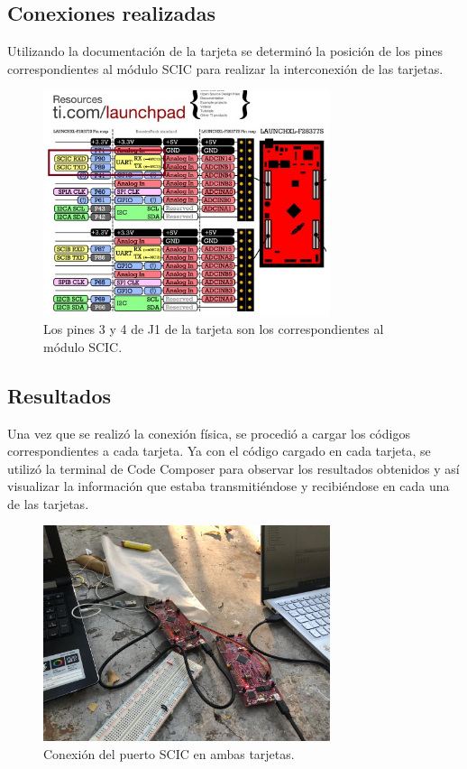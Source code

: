 \documentclass[12pt, letterpaper]{article}
\begin{document}
\subsection{Conexiones realizadas}
Utilizando la documentación de la tarjeta se determinó la posición de los pines correspondientes al módulo SCIC para realizar la interconexión de las tarjetas.

\begin{figure}[H]
    \centering
    \includegraphics[width=0.75\textwidth]{img/desarrollo/PIN_MAP.jpg}
    \caption{Los pines 3 y 4 de J1 de la tarjeta son los correspondientes al módulo SCIC.}
\end{figure}

\subsection{Resultados}
Una vez que se realizó la conexión física, se procedió a cargar los códigos correspondientes a cada tarjeta. Ya con el código cargado en cada tarjeta, se utilizó la terminal de Code Composer para observar los resultados obtenidos y así visualizar la información que estaba transmitiéndose y recibiéndose en cada una de las tarjetas.

\begin{figure}[H]
    \centering
    \includegraphics[width=0.75\textwidth]{img/desarrollo/RES_1.jpg}
    \caption{Conexión del puerto SCIC en ambas tarjetas.}
\end{figure}
\end{document}
